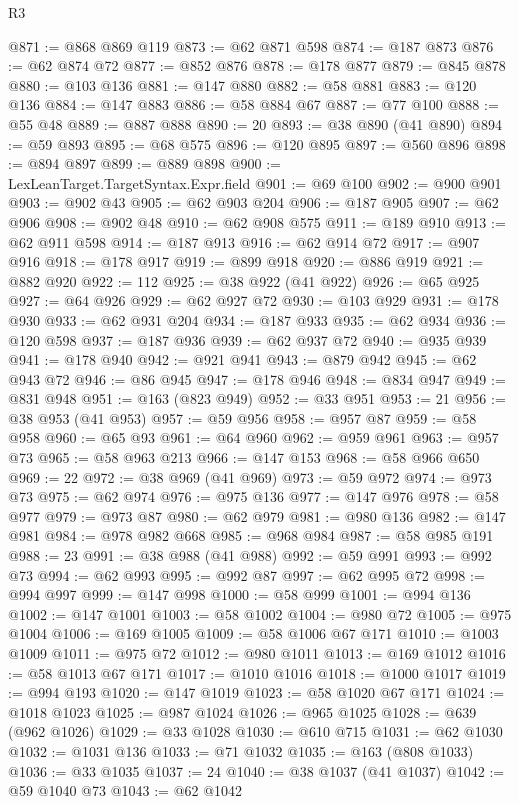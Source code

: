 \begin{lexlean}{R3}
\begin{coremodule}
@871 := @868 @869 @119
@873 := @62 @871 @598
@874 := @187 @873
@876 := @62 @874 @72
@877 := @852 @876
@878 := @178 @877
@879 := @845 @878
@880 := @103 @136
@881 := @147 @880
@882 := @58 @881
@883 := @120 @136
@884 := @147 @883
@886 := @58 @884 @67
@887 := @77 @100
@888 := @55 @48
@889 := @887 @888
@890 := 20
@893 := @38 @890 (@41 @890)
@894 := @59 @893
@895 := @68 @575
@896 := @120 @895
@897 := @560 @896
@898 := @894 @897
@899 := @889 @898
@900 := LexLeanTarget.TargetSyntax.Expr.field
@901 := @69 @100
@902 := @900 @901
@903 := @902 @43
@905 := @62 @903 @204
@906 := @187 @905
@907 := @62 @906
@908 := @902 @48
@910 := @62 @908 @575
@911 := @189 @910
@913 := @62 @911 @598
@914 := @187 @913
@916 := @62 @914 @72
@917 := @907 @916
@918 := @178 @917
@919 := @899 @918
@920 := @886 @919
@921 := @882 @920
@922 := 112
@925 := @38 @922 (@41 @922)
@926 := @65 @925
@927 := @64 @926
@929 := @62 @927 @72
@930 := @103 @929
@931 := @178 @930
@933 := @62 @931 @204
@934 := @187 @933
@935 := @62 @934
@936 := @120 @598
@937 := @187 @936
@939 := @62 @937 @72
@940 := @935 @939
@941 := @178 @940
@942 := @921 @941
@943 := @879 @942
@945 := @62 @943 @72
@946 := @86 @945
@947 := @178 @946
@948 := @834 @947
@949 := @831 @948
@951 := @163 (@823 @949)
@952 := @33 @951
@953 := 21
@956 := @38 @953 (@41 @953)
@957 := @59 @956
@958 := @957 @87
@959 := @58 @958
@960 := @65 @93
@961 := @64 @960
@962 := @959 @961
@963 := @957 @73
@965 := @58 @963 @213
@966 := @147 @153
@968 := @58 @966 @650
@969 := 22
@972 := @38 @969 (@41 @969)
@973 := @59 @972
@974 := @973 @73
@975 := @62 @974
@976 := @975 @136
@977 := @147 @976
@978 := @58 @977
@979 := @973 @87
@980 := @62 @979
@981 := @980 @136
@982 := @147 @981
@984 := @978 @982 @668
@985 := @968 @984
@987 := @58 @985 @191
@988 := 23
@991 := @38 @988 (@41 @988)
@992 := @59 @991
@993 := @992 @73
@994 := @62 @993
@995 := @992 @87
@997 := @62 @995 @72
@998 := @994 @997
@999 := @147 @998
@1000 := @58 @999
@1001 := @994 @136
@1002 := @147 @1001
@1003 := @58 @1002
@1004 := @980 @72
@1005 := @975 @1004
@1006 := @169 @1005
@1009 := @58 @1006 @67 @171
@1010 := @1003 @1009
@1011 := @975 @72
@1012 := @980 @1011
@1013 := @169 @1012
@1016 := @58 @1013 @67 @171
@1017 := @1010 @1016
@1018 := @1000 @1017
@1019 := @994 @193
@1020 := @147 @1019
@1023 := @58 @1020 @67 @171
@1024 := @1018 @1023
@1025 := @987 @1024
@1026 := @965 @1025
@1028 := @639 (@962 @1026)
@1029 := @33 @1028
@1030 := @610 @715
@1031 := @62 @1030
@1032 := @1031 @136
@1033 := @71 @1032
@1035 := @163 (@808 @1033)
@1036 := @33 @1035
@1037 := 24
@1040 := @38 @1037 (@41 @1037)
@1042 := @59 @1040 @73
@1043 := @62 @1042

\end{coremodule}
\end{lexlean}
